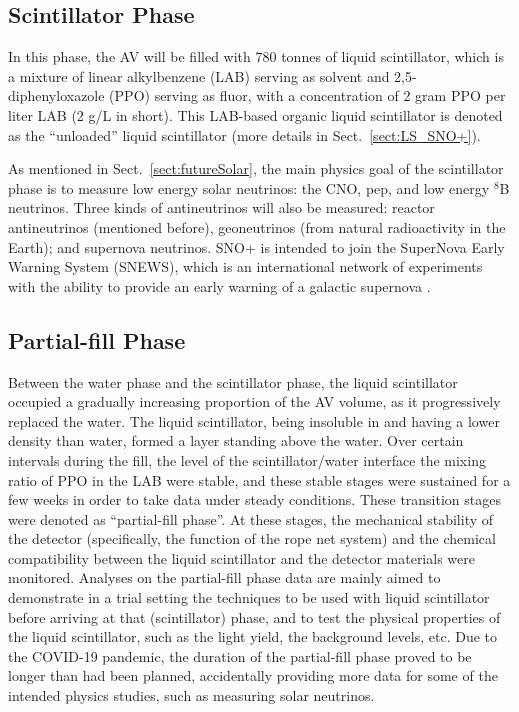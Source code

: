 \subsection{Scintillator Phase} \label{sect:scintPhase}

In this phase, the AV will be filled with 780 tonnes of liquid scintillator, which is a mixture of linear alkylbenzene (LAB) serving as solvent and 2,5-diphenyloxazole (PPO) serving as fluor, with a concentration of 2 gram PPO per liter LAB (2 g/L in short). This LAB-based organic liquid scintillator is denoted as the ``unloaded'' liquid scintillator (more details in Sect.~\ref{sect:LS_SNO+}).

As mentioned in Sect.~\ref{sect:futureSolar}, the main physics goal of the scintillator phase is to measure low energy solar neutrinos: the CNO, pep, and low energy $^8$B neutrinos. Three kinds of antineutrinos will also be measured: reactor antineutrinos (mentioned before), geoneutrinos (from natural radioactivity in the Earth); and supernova neutrinos. SNO+ is intended to join the SuperNova Early Warning System (SNEWS), which is an international network of experiments with the ability to provide an early warning of a galactic supernova \cite{snop_jinst}.

\subsection{Partial-fill Phase} \label{sect:partialPhase}

Between the water phase and the scintillator phase, the liquid scintillator occupied a gradually increasing proportion of the AV volume, as it progressively replaced the water. The liquid scintillator, being insoluble in and having a lower density than water, formed a layer standing above the water. Over certain intervals during the fill, the level of the scintillator/water interface the mixing ratio of PPO in the LAB were stable, and these stable stages were sustained for a few weeks in order to take data under steady conditions. These transition stages were denoted as ``partial-fill phase''. At these stages, the mechanical stability of the detector (specifically, the function of the rope net system) and the chemical compatibility between the liquid scintillator and the detector materials were monitored. Analyses on the partial-fill phase data are mainly aimed to demonstrate in a trial setting the techniques to be used with liquid scintillator before arriving at that (scintillator) phase, and to test the physical properties of the liquid scintillator, such as the light yield, the background levels, etc. Due to the COVID-19 pandemic, the duration of the partial-fill phase proved to be longer than had been planned, accidentally providing more data for some of the intended physics studies, such as measuring solar neutrinos.

